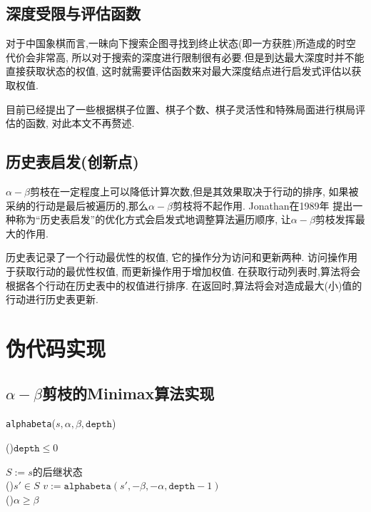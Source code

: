     \subsection{深度受限与评估函数}

    对于中国象棋而言,一昧向下搜索企图寻找到终止状态(即一方获胜)所造成的时空代价会非常高,
    所以对于搜索的深度进行限制很有必要.但是到达最大深度时并不能直接获取状态的权值,
    这时就需要评估函数来对最大深度结点进行启发式评估以获取权值.

    目前已经提出了一些根据棋子位置、棋子个数、棋子灵活性和特殊局面进行棋局评估的函数\cite{徐心和2006中国象棋计算机博弈关键技术分析},
    对此本文不再赘述.

    \subsection{历史表启发(创新点)}
    \(\alpha-\beta\)剪枝在一定程度上可以降低计算次数,但是其效果取决于行动的排序,
    如果被采纳的行动是最后被遍历的,那么\(\alpha-\beta\)剪枝将不起作用. Jonathan在1989年
    提出一种称为``历史表启发''的优化方式会启发式地调整算法遍历顺序\cite{schaeffer1989history},
    让\(\alpha-\beta\)剪枝发挥最大的作用.

    历史表记录了一个行动最优性的权值, 它的操作分为访问和更新两种.
    访问操作用于获取行动的最优性权值, 而更新操作用于增加权值.
    在获取行动列表时,算法将会根据各个行动在历史表中的权值进行排序.
    在返回时,算法将会对造成最大(小)值的行动进行历史表更新.

    \section{伪代码实现}

    \subsection{\(\alpha-\beta\)剪枝的Minimax算法实现}

    \begin{algorithm*}
		\caption{\texttt{alphabeta}(\(s,\alpha,\beta,\mathtt{depth}\))}
        
        \If(){\(\mathtt{depth} \le 0\)}{
        }

        \(S := s\)的后继状态 \\
        \For(){\(s' \in S\)}{
            \(v := \mathtt{alphabeta}(s',-\beta, -\alpha, \mathtt{depth} - 1)\) \\
            \If(){\(\alpha \ge \beta\)}{
                \Break
            }
        }

        \Return{\(\alpha\)}
    \end{algorithm*}
